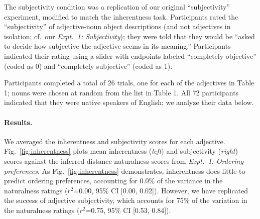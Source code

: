 \documentclass[12pt]{article}
\begin{document}
The subjectivity condition was a replication of our original ``subjectivity'' experiment, modified to match the inherentness task. Participants rated the ``subjectivity'' of adjective-noun object descriptions (and not adjectives in isolation; cf.~our \emph{Expt.~1: Subjectivity}); they were told that they would be ``asked to decide how subjective the adjective seems in its meaning.'' Participants indicated their rating using a slider with endpoints labeled ``completely objective'' (coded as 0) and ``completely subjective'' (coded as 1).

Participants completed a total of 26 trials, one for each of the adjectives in Table 1; nouns were chosen at random from the list in Table 1. All 72 participants indicated that they were native speakers of English; we analyze their data below.

\paragraph{Results.} We averaged the inherentness and subjectivity scores for each adjective. Fig.~\ref{fig:inherentness} plots mean inherentness (\emph{left}) and subjectivity (\emph{right}) scores against the inferred distance naturalness scores from \textit{Expt.~1: Ordering preferences}. As Fig.~\ref{fig:inherentness} demonstrates, inherentness does little to predict ordering preferences, accounting for 0.0\% of the variance in the naturalness ratings ($r^2${=}0.00, 95\% CI [0.00,  0.02]). However, we have replicated the success of adjective subjectivity, which accounts for 75\% of the variation in the naturalness ratings ($r^2${=}0.75, 95\% CI [0.53,  0.84]).
\end{document}

